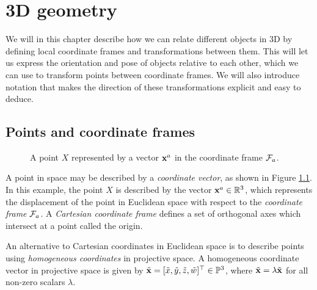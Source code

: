 \chapter{3D geometry} \label{ch:3d-geometry}
We will in this chapter describe how we can relate different objects in 3D by defining local coordinate frames and transformations between them.
This will let us express the orientation and pose of objects relative to each other, which we can use to transform points between coordinate frames.
We will also introduce notation that makes the direction of these transformations explicit and easy to deduce.


\section{Points and coordinate frames} \label{sec:points-coordinate-frames}
\begin{figure}[htb]
    \centering
    
    \caption{A point $X$ represented by a vector ${\boldsymbol{\mathbf{x}}}^a$ in the coordinate frame $\mathcal{F}_a$.}
    \label{fig:coordinate_frame}
\end{figure}
A point in space may be described by a \emph{coordinate vector}, as shown in Figure \ref{fig:coordinate_frame}.
In this example, the point $X$ is described by the vector ${\boldsymbol{\mathbf{x}}}^a \in {\mathbb R}^3$, which represents the displacement of the point in Euclidean space with respect to the \emph{coordinate frame} $\mathcal{F}_a$.
A \emph{Cartesian coordinate frame} defines a set of orthogonal axes which intersect at a point called the origin.

An alternative to Cartesian coordinates in Euclidean space is to describe points using \emph{homogeneous coordinates} in projective space.
A homogeneous coordinate vector in projective space is given by $\tilde{{\boldsymbol{\mathbf{x}}}} = [\tilde{x}, \tilde{y}, \tilde{z}, \tilde{w}]^{\top} \in {\mathbb P}^3$, where $\tilde{{\boldsymbol{\mathbf{x}}}} = \lambda \tilde{{\boldsymbol{\mathbf{x}}}}$ for all non-zero scalars $\lambda$.

